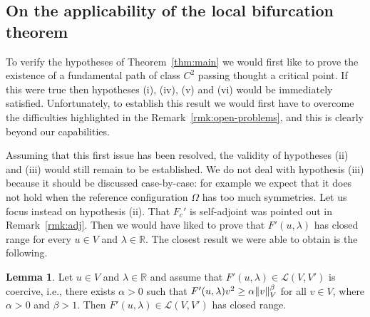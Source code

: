 \documentclass[a4paper,11pt]{article}
\theoremstyle{definition}
\newtheorem{lemma}[prop]{Lemma}
\DeclarePairedDelimiter{\norm}{\lVert}{\rVert}
\begin{document}
\subsection{On the applicability of the local bifurcation theorem}

To verify the hypotheses of Theorem~\ref{thm:main} we would first like to prove the existence of a fundamental path of class $C^2$ passing thought a critical point. If this were true then hypotheses (i), (iv), (v) and (vi) would be immediately satisfied. Unfortunately, to establish this result we would first have to overcome the difficulties highlighted in the Remark~\ref{rmk:open-problems}, and this is clearly beyond our capabilities.

Assuming that this first issue has been resolved, the validity of hypotheses (ii) and (iii) would still remain to be established. We do not deal with hypothesis (iii) because it should be discussed case-by-case: for example we expect that it does not hold when the reference configuration $\Omega$ has too much symmetries. Let us focus instead on hypothesis (ii). That $F_c'$ is self-adjoint was pointed out in Remark~\ref{rmk:adj}. Then we would have liked to prove that $F'(u,\lambda)$ has closed range for every $u\in V$ and $\lambda\in\mathbb{R}$. The closest result we were able to obtain is the following.
%
\begin{lemma}
Let $u\in V$ and $\lambda\in\mathbb{R}$ and assume that $F'(u,\lambda)\in\mathscr{L}(V,V')$ is coercive, i.e., there exists $\alpha>0$ such that $F'(u,\lambda)v^2\ge\alpha\norm{v}_V^\beta$ for all $v\in V$, where $\alpha>0$ and $\beta>1$. Then $F'(u,\lambda)\in\mathscr{L}(V,V')$ has closed range.
\end{lemma}
\end{document}
